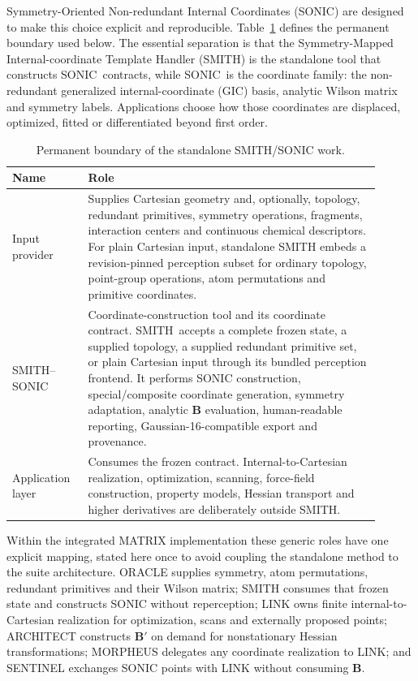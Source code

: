 \documentclass[journal=jctcce,manuscript=article,layout=traditional]{achemso}
\newcommand{\SONIC}{SONIC}
\newcommand{\SMITH}{\textsc{SMITH}}
\newcommand{\Bmat}{\mathbf{B}}
\theoremstyle{definition}
\begin{document}
Symmetry-Oriented Non-redundant Internal Coordinates (SONIC) are designed to
make this choice explicit and reproducible.  Table~\ref{tab:framework-roles}
defines the permanent boundary used below.  The essential separation is that
the Symmetry-Mapped Internal-coordinate Template Handler (\SMITH) is the
standalone tool that constructs \SONIC\ contracts, while
\SONIC\ is the coordinate family: the non-redundant generalized
internal-coordinate (GIC) basis, analytic
Wilson matrix and symmetry labels.  Applications choose how those coordinates
are displaced, optimized, fitted or differentiated beyond first order.

\begin{table}[htbp]
\centering
\caption{Permanent boundary of the standalone SMITH/SONIC work.}
\label{tab:framework-roles}
\begin{tabular}{@{}p{0.18\linewidth}p{0.72\linewidth}@{}}
\toprule
Name & Role \\
\midrule
Input provider & Supplies Cartesian geometry and, optionally, topology,
redundant primitives, symmetry operations, fragments, interaction centers and
continuous chemical descriptors.  For plain Cartesian input, standalone SMITH
embeds a revision-pinned perception subset for ordinary topology, point-group
operations, atom permutations and primitive coordinates. \\
\midrule
\SMITH{}--\SONIC & Coordinate-construction tool and its coordinate
contract.  \SMITH\ accepts a complete frozen state, a supplied topology, a
supplied redundant primitive set, or plain Cartesian input through its bundled
perception frontend.  It performs SONIC construction, special/composite coordinate
generation, symmetry adaptation, analytic \(\Bmat\) evaluation, human-readable
reporting, Gaussian-16-compatible export and provenance. \\
\midrule
Application layer & Consumes the frozen contract.  Internal-to-Cartesian
realization, optimization, scanning, force-field construction, property
models, Hessian transport and higher derivatives are deliberately outside
SMITH. \\
\bottomrule
\end{tabular}
\end{table}

Within the integrated MATRIX implementation these generic roles have one
explicit mapping, stated here once to avoid coupling the standalone method to
the suite architecture. ORACLE supplies symmetry, atom permutations, redundant
primitives and their Wilson matrix; SMITH consumes that frozen state and
constructs SONIC without reperception; LINK owns finite internal-to-Cartesian
realization for optimization, scans and externally proposed points; ARCHITECT
constructs $\Bmat'$ on demand for nonstationary Hessian transformations;
MORPHEUS delegates any coordinate realization to LINK; and SENTINEL exchanges
SONIC points with LINK without consuming $\Bmat$.
\end{document}
